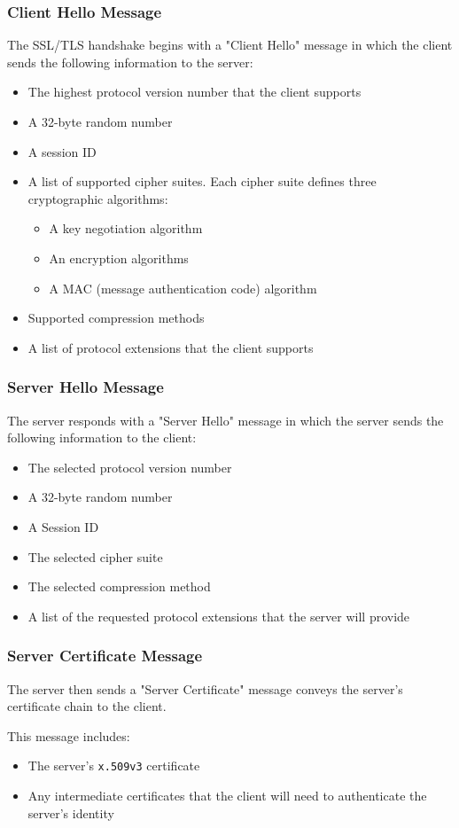 \documentclass[aspectratio=169]{beamer}
\begin{document}
\begin{frame}[roundel=siiblue]
	\frametitle{Client Hello Message}
	The SSL/TLS handshake begins with a "Client Hello" message in which the client sends the following information to the server:
	\begin{itemize}
		\item The highest protocol version number that the client supports
		\item A 32-byte random number
		\item A session ID
		\item A list of supported cipher suites.  Each cipher suite defines three cryptographic algorithms:
			\begin{itemize}
				\item A key negotiation algorithm
				\item An encryption algorithms
				\item A MAC (message authentication code) algorithm
			\end{itemize}
		\item Supported compression methods
		\item A list of protocol extensions that the client supports
	\end{itemize}
\end{frame}

\begin{frame}[roundel=siiblue]
	\frametitle{Server Hello Message}
	The server responds with a "Server Hello" message in which the server sends the following information to the client:
	\begin{itemize}
		\item The selected protocol version number
		\item A 32-byte random number
		\item A Session ID
		\item The selected cipher suite
		\item The selected compression method
		\item A list of the requested protocol extensions that the server will provide
	\end{itemize}
\end{frame}


\begin{frame}[roundel=siiblue]
	\frametitle{Server Certificate Message}
	The server then sends a "Server Certificate" message conveys the server's certificate chain to the client.  
	
	\vfill
	
	This message includes:
	\begin{itemize}
		\item The server's \texttt{x.509v3} certificate
		\item Any intermediate certificates that the client will need to authenticate the server's identity
	\end{itemize}
\end{frame}
\end{document}
